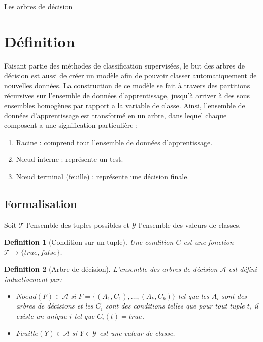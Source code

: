\documentclass[a4paper, 11pt]{report}
\newtheorem{definition}{Definition}
\newcommand{\set}[1]{\ensuremath{\overline{#1}}}
\newcommand{\tupleset}{\ensuremath{\mathcal{T}}}
\newcommand{\arbreset}{\ensuremath{\mathcal{A}}}
\newcommand{\classeset}{\ensuremath{\mathcal{Y}}}
\begin{document}
\begin{chapter}{Les arbres de décision}
\section{Définition}
Faisant partie des méthodes de classification supervisées, le but des arbres de décision est aussi de créer un modèle afin de pouvoir classer automatiquement de nouvelles données. La construction de ce modèle se fait à travers des partitions récursives sur l'ensemble de données d'apprentissage, jusqu'à arriver à des sous ensembles homogènes par rapport a la variable de classe. Ainsi, l'ensemble de données d'apprentissage est transformé en un arbre, dans lequel chaque composent a une signification particulière :
\begin{enumerate}
\item Racine : comprend tout l'ensemble de données d'apprentissage. 
\item Nœud interne : représente un test.
\item Nœud terminal (feuille) : représente une décision finale.
\end{enumerate}

\subsection{Formalisation}
\label{sec:formalisation}

Soit $\tupleset$ l'ensemble des tuples possibles et $\classeset$ l'ensemble des valeurs de classes.

\begin{definition}[Condition sur un tuple]
  Une condition $C$ est une fonction $\tupleset\rightarrow\{true,false\}$.
\end{definition}

\begin{definition}[Arbre de décision]
  L'ensemble des arbres de décision $\arbreset$ est défini inductivement par:
  \begin{itemize}
  \item $Noeud(F)\in\arbreset$ si $F=\{(A_1,C_1),\dots,(A_k,C_k)\}$ tel que les $A_i$ sont des arbres de décisions et les $C_i$ sont des conditions telles que pour tout tuple $t$, il existe un unique $i$ tel que $C_i(t)=true$. 
  \item $Feuille(Y)\in\arbreset$ si $Y\in\classeset$ est une valeur de classe.
  \end{itemize}
\end{definition}


\end{chapter}
\end{document}
